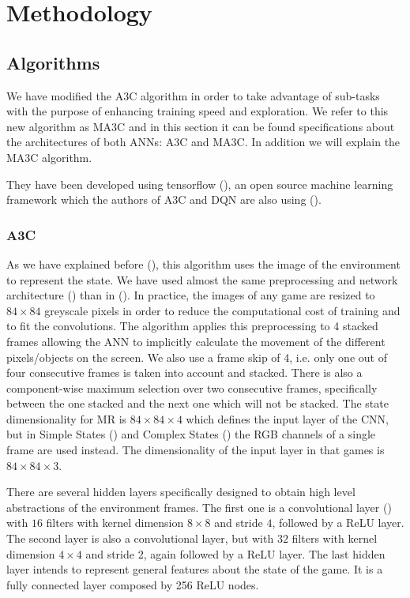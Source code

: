 \chapter{Methodology}

\section{Algorithms}

We have modified the \ac{A3C} algorithm in order to take advantage of sub-tasks with the purpose of enhancing training speed
and exploration.
We refer to this new algorithm as \acf{MA3C} and in this section it can be found specifications about the architectures of
both \acp{ANN}: \ac{A3C} and \ac{MA3C}.
In addition we will explain the \ac{MA3C} algorithm.

They have been developed using tensorflow (\cite{tensorflow2015}), an open source machine learning framework which the authors
of \ac{A3C} and \ac{DQN} are also using (\cite{deepmind_tensorflow}).

\subsection{\acl{A3C}\label{subsec:AlgorithmA3C}}

As we have explained before (), this algorithm uses the image of the environment to represent the state.
We have used almost the same preprocessing and network architecture () than in  (\cite{mnih2016A3C}).
In practice, the images of any game are resized to $84 \times 84$ greyscale pixels in order to reduce the computational cost of training and to fit the convolutions.
The algorithm applies this preprocessing to 4 stacked frames allowing the \ac{ANN} to implicitly calculate the movement
of the different pixels/objects on the screen.
We also use a frame skip of 4, i.e. only one out of four consecutive frames is taken into account and stacked.
There is also a component-wise maximum selection over two consecutive frames, specifically between the one stacked and the next one which will
not be stacked.
The state dimensionality for \ac{MR} is $84 \times 84 \times 4$ which defines the input layer of the \ac{CNN}, but in Simple States
() and Complex States ()
the RGB channels of a single frame are used instead.
The dimensionality of the input layer in that games is $84 \times 84 \times 3$.

There are several hidden layers specifically designed to obtain high level abstractions of the environment frames.
The first one is a convolutional layer () with $16$ filters with kernel dimension $8 \times 8$ and stride $4$,
followed by a \ac{ReLU} layer.
The second layer is also a convolutional layer, but with $32$ filters with kernel dimension $4 \times 4$ and stride 2,
again followed by a \ac{ReLU} layer.
The last hidden layer intends to represent general features about the state of the game.
It is a fully connected layer composed by 256 ReLU nodes.

